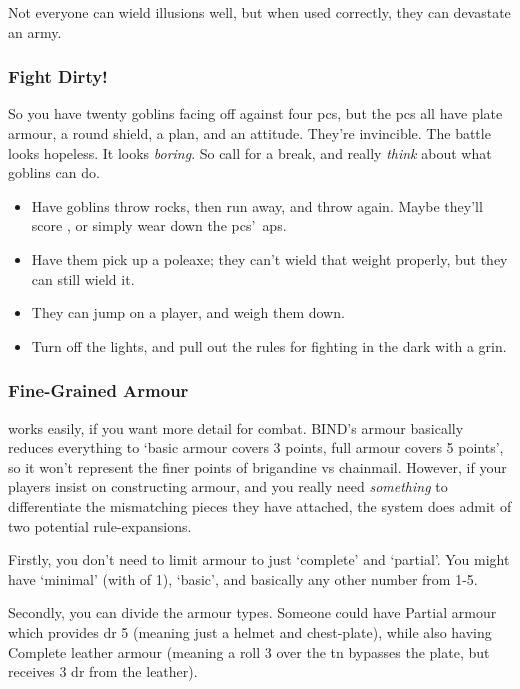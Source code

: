 \begin{multicols}{2}
Not everyone can wield illusions well, but when used correctly, they can devastate an army.

\subsubsection{Fight Dirty!}
So you have twenty goblins facing off against four \glspl{pc}, but the \glspl{pc} all have plate armour, a round shield, a plan, and an attitude.
They're invincible.
The battle looks hopeless.
It looks \emph{boring}.
So call for a break, and really \emph{think} about what goblins can do.

\begin{itemize}
  \item
  Have goblins throw rocks, then run away, and throw again.
  Maybe they'll score , or simply wear down the \glspl{pc}'~\glspl{ap}.
  \item
  Have them pick up a poleaxe; they can't wield that weight properly, but they can still wield it.
  \item
  They can jump on a player, and weigh them down.
  \item
  Turn off the lights, and pull out the rules for fighting in the dark with a grin.%
\end{itemize}

\subsubsection{Fine-Grained Armour}
works easily, if you want more detail for combat.
BIND's armour basically reduces everything to `basic armour covers 3 points, full armour covers 5 points', so it won't represent the finer points of brigandine vs chainmail.
However, if your players insist on constructing armour, and you really need \emph{something} to differentiate the mismatching pieces they have attached, the system does admit of two potential rule-expansions.

Firstly, you don't need to limit armour to just `complete' and `partial'.
You might have `minimal' (with  of 1), `basic', and basically any other number from 1-5.

Secondly, you can divide the armour types.
Someone could have Partial armour which provides \gls{dr} 5 (meaning just a helmet and chest-plate), while also having Complete leather armour (meaning a roll 3 over the \gls{tn} bypasses the plate, but receives 3 \gls{dr} from the leather).


\end{multicols}
